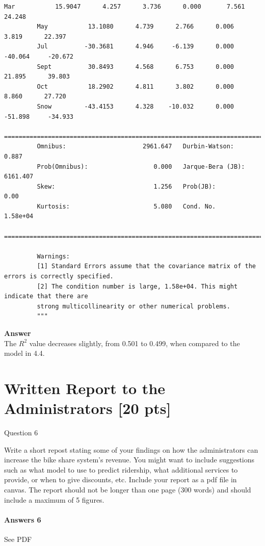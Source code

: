 \documentclass[11pt]{article}
\begin{document}
\begin{Verbatim}[commandchars=\\\{\}]
         Mar           15.9047      4.257      3.736      0.000       7.561      24.248
         May           13.1080      4.739      2.766      0.006       3.819      22.397
         Jul          -30.3681      4.946     -6.139      0.000     -40.064     -20.672
         Sept          30.8493      4.568      6.753      0.000      21.895      39.803
         Oct           18.2902      4.811      3.802      0.000       8.860      27.720
         Snow         -43.4153      4.328    -10.032      0.000     -51.898     -34.933
         ==============================================================================
         Omnibus:                     2961.647   Durbin-Watson:                   0.887
         Prob(Omnibus):                  0.000   Jarque-Bera (JB):             6161.407
         Skew:                           1.256   Prob(JB):                         0.00
         Kurtosis:                       5.080   Cond. No.                     1.58e+04
         ==============================================================================
         
         Warnings:
         [1] Standard Errors assume that the covariance matrix of the errors is correctly specified.
         [2] The condition number is large, 1.58e+04. This might indicate that there are
         strong multicollinearity or other numerical problems.
         """
\end{Verbatim}
            
    \textbf{Answer}\\
The \(R^2\) value decreases slightly, from 0.501 to 0.499, when compared
to the model in 4.4.

    \section{Written Report to the Administrators {[}20
pts{]}}\label{written-report-to-the-administrators-20-pts}

 Question 6

Write a short repost stating some of your findings on how the
administrators can increase the bike share system's revenue. You might
want to include suggestions such as what model to use to predict
ridership, what additional services to provide, or when to give
discounts, etc. Include your report as a pdf file in canvas. The report
should not be longer than one page (300 words) and should include a
maximum of 5 figures.

    \paragraph{Answers 6}\label{answers-6}

    See PDF


    
    
    
    
\end{document}
